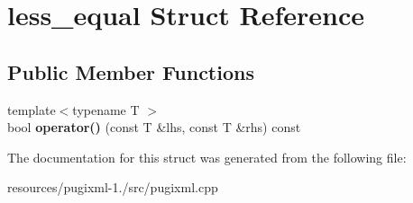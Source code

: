 \hypertarget{structless__equal}{\section{less\+\_\+equal Struct Reference}
\label{structless__equal}
}
\subsection*{Public Member Functions}
\begin{DoxyCompactItemize}
\item 
\hypertarget{structless__equal_a88d7a445c55ca234e3595aa086ff6a7d}{{\footnotesize template$<$typename T $>$ }\\bool {\bfseries operator()} (const T \&lhs, const T \&rhs) const }\label{structless__equal_a88d7a445c55ca234e3595aa086ff6a7d}

\end{DoxyCompactItemize}


The documentation for this struct was generated from the following file\+:\begin{DoxyCompactItemize}
\item 
resources/pugixml-\/1./src/pugixml.\+cpp\end{DoxyCompactItemize}
